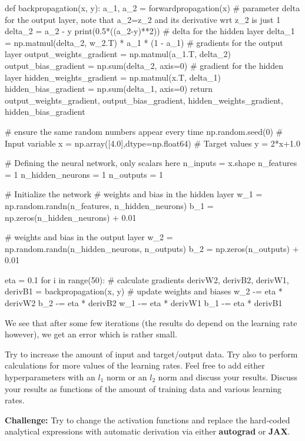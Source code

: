 \documentclass[%
oneside,                 %
final,                   %
10pt]{article}
\newenvironment{doconceexercise}{}{}
\newcounter{doconceexercisecounter}
\begin{document}
def backpropagation(x, y):
    a_1, a_2 = forwardpropagation(x)
    # parameter delta for the output layer, note that a_2=z_2 and its derivative wrt z_2 is just 1
    delta_2 = a_2 - y
    print(0.5*((a_2-y)**2))
    # delta for  the hidden layer
    delta_1 = np.matmul(delta_2, w_2.T) * a_1 * (1 - a_1)
    # gradients for the output layer
    output_weights_gradient = np.matmul(a_1.T, delta_2)
    output_bias_gradient = np.sum(delta_2, axis=0)
    # gradient for the hidden layer
    hidden_weights_gradient = np.matmul(x.T, delta_1)
    hidden_bias_gradient = np.sum(delta_1, axis=0)
    return output_weights_gradient, output_bias_gradient, hidden_weights_gradient, hidden_bias_gradient


# ensure the same random numbers appear every time
np.random.seed(0)
# Input variable
x = np.array([4.0],dtype=np.float64)
# Target values
y = 2*x+1.0 

# Defining the neural network, only scalars here
n_inputs = x.shape
n_features = 1
n_hidden_neurons = 1
n_outputs = 1

# Initialize the network
# weights and bias in the hidden layer
w_1 = np.random.randn(n_features, n_hidden_neurons)
b_1 = np.zeros(n_hidden_neurons) + 0.01

# weights and bias in the output layer
w_2 = np.random.randn(n_hidden_neurons, n_outputs)
b_2 = np.zeros(n_outputs) + 0.01

eta = 0.1
for i in range(50):
    # calculate gradients
    derivW2, derivB2, derivW1, derivB1 = backpropagation(x, y)
    # update weights and biases
    w_2 -= eta * derivW2
    b_2 -= eta * derivB2
    w_1 -= eta * derivW1
    b_1 -= eta * derivB1



\epycod


We see that after some few iterations (the results do depend on the learning rate however), we get an error which is rather small.


\begin{doconceexercise}

                             

Try to increase the amount of input and
target/output data. Try also to perform calculations for more values
of the learning rates. Feel free to add either hyperparameters with an
$l_1$ norm or an $l_2$ norm and discuss your results.
Discuss your results as functions of the amount of training data and various learning rates.

\textbf{Challenge:} Try to change the activation functions and replace the hard-coded analytical expressions with automatic derivation via either \textbf{autograd} or \textbf{JAX}.

\end{doconceexercise}
\end{document}
